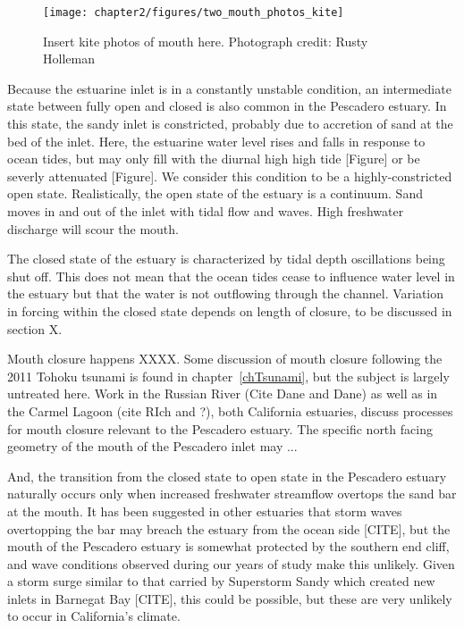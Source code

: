 \begin{figure}
	\begin{center}
		\texttt{[image: chapter2/figures/two\_mouth\_photos\_kite]} 
	\end{center}
\caption{Insert kite photos of mouth here. Photograph credit: Rusty Holleman}\label{fig:kite_photos} \end{figure}

Because the estuarine inlet is in a constantly unstable condition, an
intermediate state between fully open and closed is also common in the
Pescadero estuary.  In this state, the sandy inlet is constricted,
probably due to accretion of sand at the bed of the inlet. Here, the
estuarine water level rises and falls in response to ocean tides, but
may only fill with the diurnal high high tide [Figure] or be severly
attenuated [Figure]. We consider this condition to be a
highly-constricted open state. Realistically, the open state of the
estuary is a continuum. Sand moves in and out of the inlet with tidal
flow and waves. High freshwater discharge will scour the mouth.

The closed state of the estuary is characterized by tidal depth
oscillations being shut off. This does not mean that the ocean tides
cease to influence water level in the estuary but that the water is not
outflowing through the channel. Variation in forcing within the closed
state depends on length of closure, to be discussed in section {X}.

Mouth closure happens XXXX. Some discussion of mouth closure following the 2011 Tohoku tsunami is found in chapter~\ref{chTsunami}, but the subject is largely untreated here. Work in the Russian River (Cite Dane and Dane) as well as in the Carmel Lagoon (cite RIch and ?), both California estuaries, discuss processes for mouth closure relevant to the Pescadero estuary. The specific north facing geometry of the mouth of the Pescadero inlet may ...

And, the transition from the closed state to open state in the Pescadero
estuary naturally occurs only when increased freshwater streamflow
overtops the sand bar at the mouth. It has been suggested in other
estuaries that storm waves overtopping the bar may breach the estuary
from the ocean side [CITE], but the mouth of the Pescadero estuary is
somewhat protected by the southern end cliff, and wave conditions
observed during our years of study make this unlikely. Given a storm
surge similar to that carried by Superstorm Sandy which created new
inlets in Barnegat Bay [CITE], this could be possible, but these are
very unlikely to occur in California's climate.

